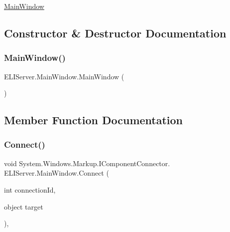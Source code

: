 \hyperlink{class_e_l_i_server_1_1_main_window}{Main\+Window} 

\subsection{Constructor \& Destructor Documentation}
\mbox{\label{class_e_l_i_server_1_1_main_window_ae50bb438e117f698b08e123aac01202b}} 
\subsubsection{\texorpdfstring{Main\+Window()}{MainWindow()}}
{\footnotesize\ttfamily E\+L\+I\+Server.\+Main\+Window.\+Main\+Window (\begin{DoxyParamCaption}{ }\end{DoxyParamCaption})\hspace{0.3cm}{\ttfamily [inline]}}



\subsection{Member Function Documentation}
\mbox{\label{class_e_l_i_server_1_1_main_window_add73716251651a09e0c0cbc405c44d1f}} 
\subsubsection{\texorpdfstring{Connect()}{Connect()}\hspace{0.1cm}{\footnotesize\ttfamily [1/2]}}
{\footnotesize\ttfamily void System.\+Windows.\+Markup.\+I\+Component\+Connector. E\+L\+I\+Server.\+Main\+Window.\+Connect (\begin{DoxyParamCaption}\item[{int}]{connection\+Id,  }\item[{object}]{target }\end{DoxyParamCaption})\hspace{0.3cm}{\ttfamily [inline]}, {\ttfamily [private]}}

